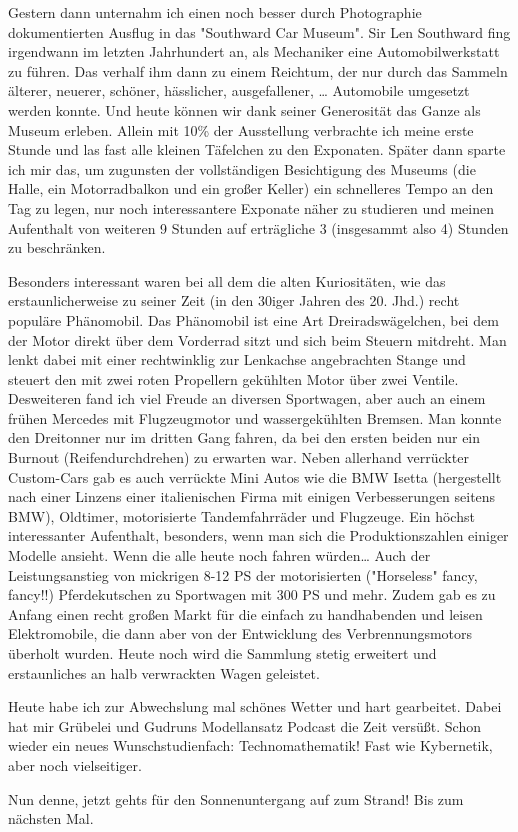 Gestern dann unternahm ich einen noch besser durch Photographie
dokumentierten Ausflug in das "Southward Car Museum". Sir Len Southward
fing irgendwann im letzten Jahrhundert an, als Mechaniker eine
Automobilwerkstatt zu führen. Das verhalf ihm dann zu einem Reichtum,
der nur durch das Sammeln älterer, neuerer, schöner, hässlicher,
ausgefallener, \ldots{} Automobile umgesetzt werden konnte. Und heute
können wir dank seiner Generosität das Ganze als Museum erleben. Allein
mit 10\% der Ausstellung verbrachte ich meine erste Stunde und las fast
alle kleinen Täfelchen zu den Exponaten. Später dann sparte ich mir das,
um zugunsten der vollständigen Besichtigung des Museums (die Halle, ein
Motorradbalkon und ein großer Keller) ein schnelleres Tempo an den Tag
zu legen, nur noch interessantere Exponate näher zu studieren und meinen
Aufenthalt von weiteren 9 Stunden auf erträgliche 3 (insgesammt also 4)
Stunden zu beschränken.

Besonders interessant waren bei all dem die alten Kuriositäten, wie das
erstaunlicherweise zu seiner Zeit (in den 30iger Jahren des 20. Jhd.)
recht populäre Phänomobil. Das Phänomobil ist eine Art
Dreiradswägelchen, bei dem der Motor direkt über dem Vorderrad sitzt und
sich beim Steuern mitdreht. Man lenkt dabei mit einer rechtwinklig zur
Lenkachse angebrachten Stange und steuert den mit zwei roten Propellern
gekühlten Motor über zwei Ventile. Desweiteren fand ich viel Freude an
diversen Sportwagen, aber auch an einem frühen Mercedes mit
Flugzeugmotor und wassergekühlten Bremsen. Man konnte den Dreitonner nur
im dritten Gang fahren, da bei den ersten beiden nur ein Burnout
(Reifendurchdrehen) zu erwarten war. Neben allerhand verrückter
Custom-Cars gab es auch verrückte Mini Autos wie die BMW Isetta
(hergestellt nach einer Linzens einer italienischen Firma mit einigen
Verbesserungen seitens BMW), Oldtimer, motorisierte Tandemfahrräder und
Flugzeuge. Ein höchst interessanter Aufenthalt, besonders, wenn man sich
die Produktionszahlen einiger Modelle ansieht. Wenn die alle heute noch
fahren würden\ldots{} Auch der Leistungsanstieg von mickrigen 8-12 PS
der motorisierten ("Horseless" fancy, fancy!!) Pferdekutschen zu
Sportwagen mit 300 PS und mehr. Zudem gab es zu Anfang einen recht
großen Markt für die einfach zu handhabenden und leisen Elektromobile,
die dann aber von der Entwicklung des Verbrennungsmotors überholt
wurden. Heute noch wird die Sammlung stetig erweitert und erstaunliches
an halb verwrackten Wagen geleistet.

Heute habe ich zur Abwechslung mal schönes Wetter und hart gearbeitet.
Dabei hat mir Grübelei und Gudruns Modellansatz Podcast die Zeit
versüßt. Schon wieder ein neues Wunschstudienfach: Technomathematik!
Fast wie Kybernetik, aber noch vielseitiger.

Nun denne, jetzt gehts für den Sonnenuntergang auf zum Strand! Bis zum
nächsten Mal.
